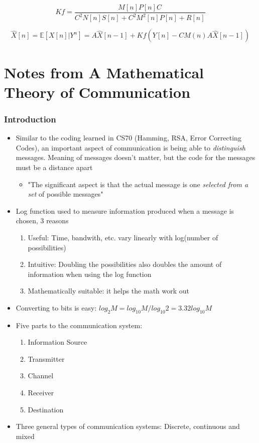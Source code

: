 \documentclass[leqno,twocolumn]{article}
\begin{document}
\[\boxed{Kf = \frac{M[n]P[n]C}{C^2N[n]S[n] + C^2M^2[n]P[n] + R[n]}} \]

\[\hat{X}[n] = \mathbb{E}[X[n]|Y^n] = A\hat{X}[n-1] + Kf\left(Y[n]-CM(n)A\hat{X}[n-1] \right) \]

\section{Notes from A Mathematical Theory of Communication}
\subsubsection{Introduction}
\begin{itemize}
\item Similar to the coding learned in CS70 (Hamming, RSA, Error Correcting Codes), an important aspect of communication is being able to \textit{distinguish} messages. Meaning of messages doesn't matter, but the code for the messages must be a distance apart
\begin{itemize}
\item "The significant aspect is that the actual message is one \textit{selected from a set} of possible messages"
\end{itemize}
\item Log function used to measure information  produced when a message is chosen, 3 reasons
\begin{enumerate}
\item Useful: Time, bandwith, etc. vary linearly with log(number of possibilities)
\item Intuitive: Doubling the possibilities also doubles the amount of information when using the log function
\item Mathematically suitable: it helps the math work out
\end{enumerate}
\item Converting to bits is easy: $log_2M = log_{10}M/log_{10}2 = 3.32log_{10}M$
\item Five parts to the communication system:
\begin{enumerate}
\item Information Source
\item Transmitter
\item Channel
\item Receiver
\item Destination
\end{enumerate}
\item Three general types of communication systems: Discrete, continuous and mixed
\end{itemize}
\end{document}
